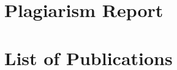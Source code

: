 \documentclass[12pt,a4paper]{report}
\begin{document}
\pagestyle{plain}







\tableofcontents
\listoffigures
\listoftables

\clearpage
\pagestyle{plain}









\appendix
\newpage
\chapter{Plagiarism Report}\thispagestyle{plain}
\chapter{List of Publications}
\begin{figure}[h]
	\centering
	\label{fig:my_label}
\end{figure}

\end{document}
